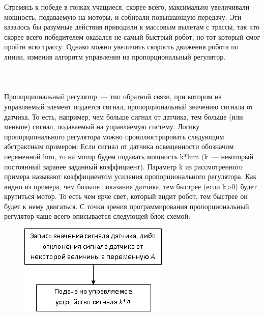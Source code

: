 Стремясь к победе в гонках учащиеся, скорее всего, максимально увеличивали мощность, подаваемую на моторы, и собирали повышающую передачу. Эти казалось бы разумные действия приводили к массовым вылетам с трассы, так что скорее всего победителем оказался не самый быстрый робот, но тот который смог пройти всю трассу. Однако можно увеличить скорость движения робота по линии, изменив алгоритм управления на пропорциональный регулятор.\\\\

{\hypertarget{lesson16x4}{}}\\\\

Пропорциональный регулятор~--- тип обратной связи, при котором на управляемый элемент подается сигнал, пропорциональный значению сигнала от датчика. То есть, например, чем больше сигнал от датчика, тем больше (или меньше) сигнал, подаваемый на управляемую систему. Логику пропорционального регулятора можно проиллюстрировать следующим абстрактным примером: Если сигнал от датчика освещенности обозначим переменной lum, то на мотор будем подавать мощность k*lum (k~--- некоторый постоянный заранее заданный коэффициент). Параметр k из рассмотренного примера называют коэффициентом усиления пропорционального регулятора. Как видно из примера, чем больше показания датчика, тем быстрее (если k>0) будет крутиться мотор. То есть чем ярче свет, который видит робот, тем быстрее он будет к нему двигаться. С точки зрения программирования пропорциональный регулятор чаще всего описывается следующей блок схемой:

\begin{figure}[h!]
	\begin{center}
		\includegraphics[width=0.75\linewidth]{chapters/chapter16/images/4}
		\caption{}
		\label{ris:image16x4}
	\end{center}
\end{figure}

